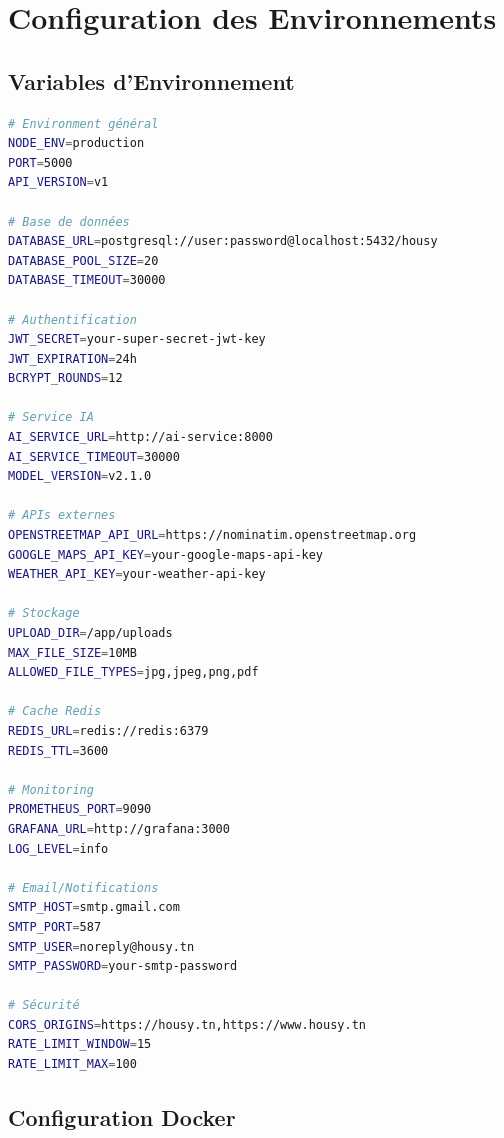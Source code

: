 \section{Configuration des Environnements}

\subsection{Variables d'Environnement}

\begin{lstlisting}[language=bash, caption=Configuration des variables d'environnement]
# Environment général
NODE_ENV=production
PORT=5000
API_VERSION=v1

# Base de données
DATABASE_URL=postgresql://user:password@localhost:5432/housy
DATABASE_POOL_SIZE=20
DATABASE_TIMEOUT=30000

# Authentification
JWT_SECRET=your-super-secret-jwt-key
JWT_EXPIRATION=24h
BCRYPT_ROUNDS=12

# Service IA
AI_SERVICE_URL=http://ai-service:8000
AI_SERVICE_TIMEOUT=30000
MODEL_VERSION=v2.1.0

# APIs externes
OPENSTREETMAP_API_URL=https://nominatim.openstreetmap.org
GOOGLE_MAPS_API_KEY=your-google-maps-api-key
WEATHER_API_KEY=your-weather-api-key

# Stockage
UPLOAD_DIR=/app/uploads
MAX_FILE_SIZE=10MB
ALLOWED_FILE_TYPES=jpg,jpeg,png,pdf

# Cache Redis
REDIS_URL=redis://redis:6379
REDIS_TTL=3600

# Monitoring
PROMETHEUS_PORT=9090
GRAFANA_URL=http://grafana:3000
LOG_LEVEL=info

# Email/Notifications
SMTP_HOST=smtp.gmail.com
SMTP_PORT=587
SMTP_USER=noreply@housy.tn
SMTP_PASSWORD=your-smtp-password

# Sécurité
CORS_ORIGINS=https://housy.tn,https://www.housy.tn
RATE_LIMIT_WINDOW=15
RATE_LIMIT_MAX=100
\end{lstlisting}

\subsection{Configuration Docker}

